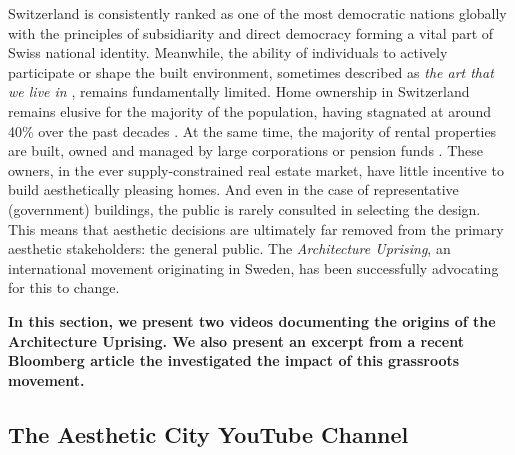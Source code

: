 \documentclass[a4paper]{article}
\begin{document}
\begin{mdframed}[linewidth=1pt, roundcorner=5pt, innerleftmargin=10pt, innerrightmargin=10pt, innertopmargin=10pt, innerbottommargin=10pt, linecolor=black, backgroundcolor=white, userdefinedwidth=\textwidth]
    Switzerland is consistently ranked as one of the most democratic nations globally \cite{noauthor_economist_2023} with the principles of subsidiarity and direct democracy forming a vital part of Swiss national identity. Meanwhile, the ability of individuals to actively participate or shape the built environment, sometimes described as \textit{the art that we live in} \cite{hughes_shock_1980}, remains fundamentally limited. Home ownership in Switzerland remains elusive for the majority of the population, having stagnated at around 40\% over the past decades \cite{noauthor_home_2022}. At the same time, the majority of rental properties are built, owned and managed by large corporations or pension funds \cite{noauthor_wem_nodate}. These owners, in the ever supply-constrained real estate market, have little incentive to build aesthetically pleasing homes. And even in the case of representative (government) buildings, the public is rarely consulted in selecting the design. This means that aesthetic decisions are ultimately far removed from the primary aesthetic stakeholders: the general public. The \textit{Architecture Uprising}, an international movement originating in Sweden, has been successfully advocating for this to change.

    \textbf{In this section, we present two videos documenting the origins of the Architecture Uprising. We also present an excerpt from a recent Bloomberg article the investigated the impact of this grassroots movement.}
\end{mdframed}


\subsection{The Aesthetic City YouTube Channel}
\end{document}
